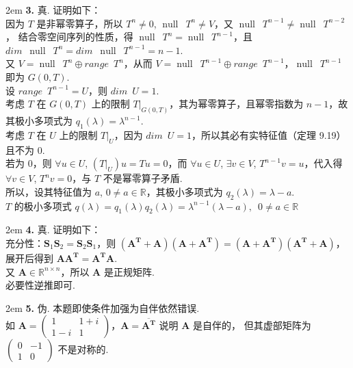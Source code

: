 \documentclass[UTF8,14pt,normal]{ctexart}
\begin{document}
    \hangindent 2em
    \noindent 
    \textbf{3.} 真. 证明如下：\\
    因为 $ T $ 是非幂零算子，所以 $ T^{n} \neq 0$, $\operatorname{null} \enspace T^{n} \neq V$，又 $ \operatorname{null} \enspace T^{n - 1} \neq \operatorname{null} \enspace T^{n - 2}$，
    结合零空间序列的性质，得 $\operatorname{null} \enspace T^{n} = \operatorname{null} \enspace T^{n-1}$，且 $dim \enspace \operatorname{null} \enspace T^{n} = dim \enspace \operatorname{null} \enspace T^{n-1} = n - 1$. \\
    又 $V = \operatorname{null} \enspace T^{n} \oplus range \enspace T^{n}$，从而 $V = \operatorname{null} \enspace T^{n - 1} \oplus range \enspace T^{n - 1}$，$\operatorname{null} \enspace T^{n - 1}$ 即为 $G(0, T)$. \\
    设 $range \enspace T^{n - 1} = U$，则 $dim \enspace U = 1$. \\
    考虑 $ T $ 在 $G(0, T)$ 上的限制 $ T|_{G(0, T)}$，其为幂零算子，且幂零指数为 $ n - 1$，故其极小多项式为 $q_{1}(\lambda) = \lambda^{n - 1}$. \\
    考虑 $ T $ 在 $ U $ 上的限制 $T|_{U}$，因为 $dim \enspace U = 1$，所以其必有实特征值（定理 9.19）且不为 0. \\
    若为 0，则 $\forall u \in U$, $(T|_{U})u = Tu = 0$，而 $\forall u \in U$, $\exists v \in V$, $T^{n - 1}v = u$，代入得 $\forall v \in V$, $T^{n}v = 0$，与 $ T $ 不是幂零算子矛盾. \\
    所以，设其特征值为 $ a $, $0 \neq a \in \mathbb{R}$，其极小多项式为 $q_{2}(\lambda) = \lambda - a$. \\
    $ T $ 的极小多项式 $q(\lambda) = q_{1}(\lambda)q_{2}(\lambda) = \lambda^{n - 1}(\lambda - a), \enspace 0 \neq a \in \mathbb{R}$ 

    \hangindent 2em
    \noindent 
    \textbf{4.} 真. 证明如下：\\
    充分性：$\mathbf{S}_{1}\mathbf{S}_{2} = \mathbf{S}_{2}\mathbf{S}_{1}$，则 $(\mathbf{A^T} + \mathbf{A})(\mathbf{A} + \mathbf{A^T}) = (\mathbf{A} + \mathbf{A^T})(\mathbf{A^T} + \mathbf{A})$，展开后得到 $\mathbf{A}\mathbf{A^T} = \mathbf{A^T}\mathbf{A}$. \\
    又 $\mathbf{A} \in \mathbb{R}^{n \times n}$，所以 $ \mathbf{A} $ 是正规矩阵. \\
    必要性逆推即可.

    \hangindent 2em
    \noindent 
    \textbf{5.} 伪. 本题即使条件加强为自伴依然错误. \\
    如 $ \mathbf{A} = 
    \begin{pmatrix}
        1 & 1 + i \\
        1 - i & 1
    \end{pmatrix}$，$\mathbf{A} = \overline{\mathbf{A^T}}$ 说明 $\mathbf{A}$ 是自伴的，
    但其虚部矩阵为 $\begin{pmatrix}
        0 & -1 \\
        1 & 0
    \end{pmatrix}$ 不是对称的.
\end{document}
